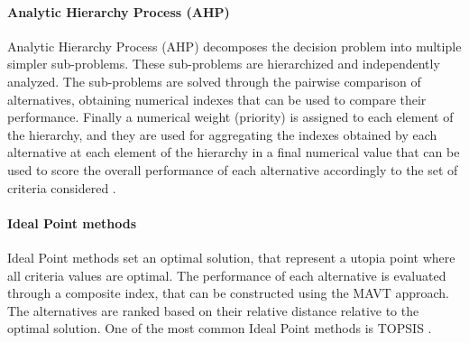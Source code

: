 \begin{refsection}[referencesCh1]
\paragraph{Analytic Hierarchy Process (AHP)}
Analytic Hierarchy Process (AHP) decomposes the decision problem into multiple simpler sub-problems. These sub-problems are hierarchized and independently analyzed. The sub-problems are solved through the pairwise comparison of alternatives, obtaining numerical indexes that can be used to compare their performance. Finally a numerical weight (priority) is assigned to each element of the hierarchy, and they are used for aggregating the indexes obtained by each alternative at each element of the hierarchy in a final numerical value that can be used to score the overall performance of each alternative accordingly to the set of criteria considered \citep{saaty2000fundamentals}. 

\paragraph{Ideal Point methods}
Ideal Point methods set an optimal solution, that represent a utopia point where all criteria values are optimal. The performance of each alternative is evaluated through a composite index, that can be constructed using the
MAVT approach. The alternatives are ranked based on their relative distance relative to the optimal solution. One of the most common Ideal Point methods is TOPSIS \citep{hwang1995multi}.




\end{refsection}
